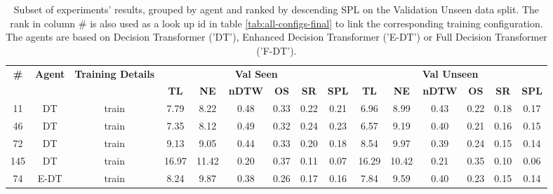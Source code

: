 \begin{table}
\centering
\caption{\label{tab:reward_type}Subset of experiments' results, grouped by agent and ranked by descending SPL on the Validation Unseen data split. The rank in column \# is also used as a look up id in table \ref{tab:all-configs-final} to link the corresponding training configuration.     \newline The agents are based on Decision Transformer ('DT'), Enhanced Decision Transformer ('E-DT') or Full Decision Transformer ('F-DT').}
\begin{tabular}{@{\hskip3pt}c@{\hskip3pt}c@{\hskip3pt}c@{\hskip3pt}c@{\hskip3pt}c@{\hskip3pt}c@{\hskip3pt}c@{\hskip3pt}c@{\hskip3pt}c@{\hskip3pt}c@{\hskip3pt}c@{\hskip3pt}c@{\hskip3pt}c@{\hskip3pt}c@{\hskip3pt}c}
\toprule
\textbf{\#} & \textbf{Agent} & \textbf{Training Details} & \multicolumn{6}{c}{\textbf{Val Seen}} & \multicolumn{6}{c}{\textbf{Val Unseen}} \\
 \textbf{~} &     \textbf{~} &                \textbf{~} &       \textbf{TL} & \textbf{NE} & \textbf{nDTW} & \textbf{OS} & \textbf{SR} & \textbf{SPL} &         \textbf{TL} & \textbf{NE} & \textbf{nDTW} & \textbf{OS} & \textbf{SR} & \textbf{SPL} \\
\midrule
         11 &             DT &                     train &              7.79 &        8.22 &          0.48 &        0.33 &        0.22 &         0.21 &                6.96 &        8.99 &          0.43 &        0.22 &        0.18 &         0.17 \\
         46 &             DT &                     train &              7.35 &        8.12 &          0.49 &        0.32 &        0.24 &         0.23 &                6.57 &        9.19 &          0.40 &        0.21 &        0.16 &         0.15 \\
         72 &             DT &                     train &              9.13 &        9.05 &          0.44 &        0.33 &        0.20 &         0.18 &                8.54 &        9.97 &          0.39 &        0.24 &        0.15 &         0.14 \\
        145 &             DT &                     train &             16.97 &       11.42 &          0.20 &        0.37 &        0.11 &         0.07 &               16.29 &       10.42 &          0.21 &        0.35 &        0.10 &         0.06 \\
         74 &           E-DT &                     train &              8.24 &        9.87 &          0.38 &        0.26 &        0.17 &         0.16 &                7.84 &        9.59 &          0.40 &        0.23 &        0.15 &         0.14 \\

\end{tabular}
\end{table}
